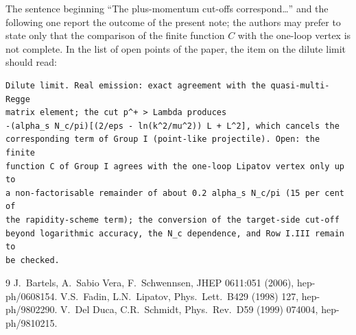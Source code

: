 \documentclass[11pt,a4paper]{article}
\begin{document}
\noindent The sentence beginning ``The plus-momentum cut-offs correspond\dots'' and the following one report the outcome of the present note; the authors may prefer to state only that the comparison of the finite function $C$ with the one-loop vertex is not complete. In the list of open points of the paper, the item on the dilute limit should read:
\begin{verbatim}
Dilute limit. Real emission: exact agreement with the quasi-multi-Regge
matrix element; the cut p^+ > Lambda produces
-(alpha_s N_c/pi)[(2/eps - ln(k^2/mu^2)) L + L^2], which cancels the
corresponding term of Group I (point-like projectile). Open: the finite
function C of Group I agrees with the one-loop Lipatov vertex only up to
a non-factorisable remainder of about 0.2 alpha_s N_c/pi (15 per cent of
the rapidity-scheme term); the conversion of the target-side cut-off
beyond logarithmic accuracy, the N_c dependence, and Row I.III remain to
be checked.
\end{verbatim}

\begin{thebibliography}{9}
 J.~Bartels, A.~Sabio Vera, F.~Schwennsen, JHEP 0611:051 (2006), hep-ph/0608154.
 V.S.~Fadin, L.N.~Lipatov, Phys.\ Lett.\ B429 (1998) 127, hep-ph/9802290.
 V.~Del Duca, C.R.~Schmidt, Phys.\ Rev.\ D59 (1999) 074004, hep-ph/9810215.
\end{thebibliography}
\end{document}
